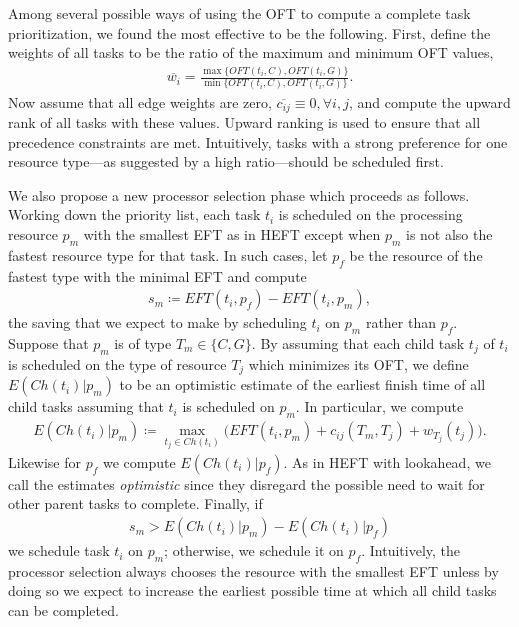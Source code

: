 \documentclass[runningheads]{llncs}
\begin{document}
Among several possible ways of using the OFT to compute a complete task prioritization, we found the most effective to be the following. First, define the weights of all tasks to be the ratio of the maximum and minimum OFT values,
\begin{align}
\label{eq.hoft_weights}
\overline{w_i} = \frac{\max\{ OFT(t_i, C), OFT(t_i, G) \}}{\min\{ OFT(t_i, C), OFT(t_i, G) \}}.
\end{align} 
Now assume that all edge weights are zero, $\overline{c_{ij}} \equiv 0, \forall i, j$, and compute the upward rank of all tasks with these values. Upward ranking is used to ensure that all precedence constraints are met. Intuitively, tasks with a strong preference for one resource type---as suggested by a high ratio---should be scheduled first. 

We also propose a new processor selection phase which proceeds as follows. Working down the priority list, each task $t_i$ is scheduled on the processing resource $p_{m}$ with the smallest EFT as in HEFT except when $p_m$ is not also the fastest resource type for that task. In such cases, let $p_f$ be the resource of the fastest type with the minimal EFT and compute 
\begin{align}
\label{eq.sm}
s_m \coloneqq EFT(t_i, p_f) - EFT(t_i, p_m),
\end{align}
the saving that we expect to make by scheduling $t_i$ on $p_m$ rather than $p_f$. Suppose that $p_m$ is of type $T_m \in \{C, G\}$. By assuming that each child task $t_j$ of $t_i$ is scheduled on the type of resource $T_j$ which minimizes its OFT, we define $E(Ch(t_i) | p_m)$ to be an optimistic estimate of the earliest finish time of all child tasks assuming that $t_i$ is scheduled on $p_m$. In particular, we compute
\begin{align}
\label{eq.oft_children}
E(Ch(t_i) | p_m) \coloneqq \max_{t_j \in Ch(t_i)} \Big( EFT(t_i, p_m) + c_{ij}(T_m, T_j) + w_{T_j}(t_j)\Big).
\end{align}
Likewise for $p_f$ we compute $E(Ch(t_i) | p_f)$. As in HEFT with lookahead, we call the estimates {\em optimistic} since they disregard the possible need to wait for other parent tasks to complete. Finally, if
\begin{align}
\label{eq.cross_condition}
s_m > E(Ch(t_i) | p_m) - E(Ch(t_i) | p_f)
\end{align}
we schedule task $t_i$ on $p_m$; otherwise, we schedule it on $p_f$. Intuitively, the processor selection always chooses the resource with the smallest EFT unless by doing so we expect to increase the earliest possible time at which all child tasks can be completed.
\end{document}
